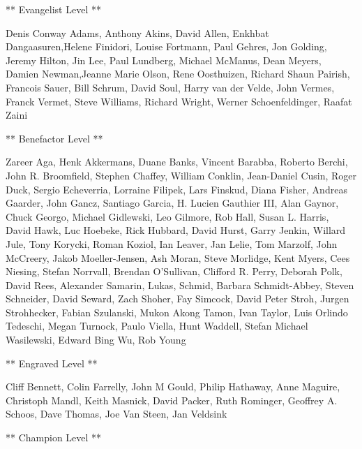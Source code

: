 \documentclass[]{memoir}
\begin{document}
** Evangelist Level **

Denis Conway Adams, Anthony Akins, David Allen, Enkhbat
Dangaasuren,Helene Finidori, Louise Fortmann, Paul Gehres, Jon Golding,
Jeremy Hilton, Jin Lee, Paul Lundberg, Michael McManus, Dean Meyers,
Damien Newman,Jeanne Marie Olson, Rene Oosthuizen, Richard Shaun
Pairish, Francois Sauer, Bill Schrum, David Soul, Harry van der Velde,
John Vermes, Franck Vermet, Steve Williams, Richard Wright, Werner
Schoenfeldinger, Raafat Zaini

** Benefactor Level **

Zareer Aga, Henk Akkermans, Duane Banks, Vincent Barabba, Roberto
Berchi, John R. Broomfield, Stephen Chaffey, William Conklin,
Jean-Daniel Cusin, Roger Duck, Sergio Echeverria, Lorraine Filipek, Lars
Finskud, Diana Fisher, Andreas Gaarder, John Gancz, Santiago Garcia, H.
Lucien Gauthier III, Alan Gaynor, Chuck Georgo, Michael Gidlewski, Leo
Gilmore, Rob Hall, Susan L. Harris, David Hawk, Luc Hoebeke, Rick
Hubbard, David Hurst, Garry Jenkin, Willard Jule, Tony Korycki, Roman
Koziol, Ian Leaver, Jan Lelie, Tom Marzolf, John McCreery, Jakob
Moeller-Jensen, Ash Moran, Steve Morlidge, Kent Myers, Cees Niesing,
Stefan Norrvall, Brendan O'Sullivan, Clifford R. Perry, Deborah Polk,
David Rees, Alexander Samarin, Lukas, Schmid, Barbara Schmidt-Abbey,
Steven Schneider, David Seward, Zach Shoher, Fay Simcock, David Peter
Stroh, Jurgen Strohhecker, Fabian Szulanski, Mukon Akong Tamon, Ivan
Taylor, Luis Orlindo Tedeschi, Megan Turnock, Paulo Viella, Hunt
Waddell, Stefan Michael Wasilewski, Edward Bing Wu, Rob Young

** Engraved Level **

Cliff Bennett, Colin Farrelly, John M Gould, Philip Hathaway, Anne
Maguire, Christoph Mandl, Keith Masnick, David Packer, Ruth Rominger,
Geoffrey A. Schoos, Dave Thomas, Joe Van Steen, Jan Veldsink

** Champion Level **
\end{document}
